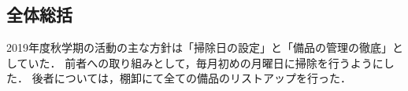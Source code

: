 \subsection*{全体総括}


2019年度秋学期の活動の主な方針は「掃除日の設定」と「備品の管理の徹底」としていた．
前者への取り組みとして，毎月初めの月曜日に掃除を行うようにした．
後者については，棚卸にて全ての備品のリストアップを行った．
